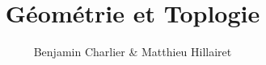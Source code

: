 \documentclass[10pt]{book}
\title{{\color{astral}\sffamily\bfseries G\'eom\'etrie et Toplogie}}
\author{Benjamin Charlier \& Matthieu Hillairet}
\begin{document}
\maketitle


\tikzexternaldisable


%



\end{document}
